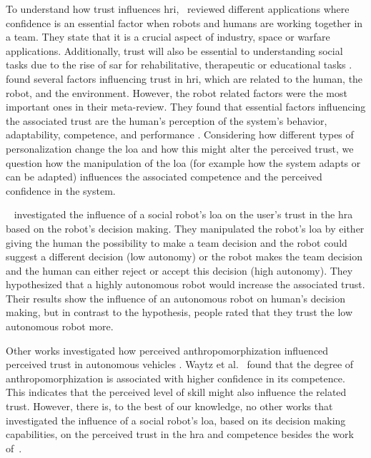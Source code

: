 \documentclass[twocolumn]{svjour3}          %
\begin{document}
To understand how trust influences \gls{hri},~\textcite{hancock2011meta} reviewed different applications where
confidence is an essential factor when robots and humans are working
together in a team. They state that it is a crucial aspect of industry,
space or warfare applications. Additionally, trust will also be
essential to understanding social tasks due to the rise of \gls{sar} for
rehabilitative, therapeutic or educational tasks
\autocite{corry,fasola2013socially}.~\citeauthor{hancock2011meta} found several
factors influencing trust in \gls{hri}, which are related to the human, the
robot, and the environment. However, the robot related factors were the
most important ones in their meta-review. They found that essential
factors influencing the associated trust are the human's perception of
the system's behavior, adaptability, competence, and performance
\autocite{hancock2011meta}. Considering how different types of
personalization change the \gls{loa} and how this might alter the perceived
trust, we question how the manipulation of the \gls{loa} (for example how the
system adapts or can be adapted) influences the associated competence
and the perceived confidence in the system.

~\textcite{rau2013effects} investigated the influence of a
social robot's \gls{loa} on the user's trust in the \gls{hra} based on the robot's
decision making. They manipulated the robot's \gls{loa} by either giving the
human the possibility to make a team decision and the robot could
suggest a different decision (low autonomy) or the robot makes the team
decision and the human can either reject or accept this decision (high
autonomy). They hypothesized that a highly autonomous robot would
increase the associated trust. Their results show the influence of an
autonomous robot on human's decision making, but in contrast to the
hypothesis, people rated that they trust the low autonomous robot more.

Other works investigated how perceived anthropomorphization influenced
perceived trust in autonomous vehicles \autocite{waytz2014mind}. Waytz
et al.~\autocite{waytz2014mind} found that the degree of
anthropomorphization is associated with higher confidence in its
competence. This indicates that the perceived level of skill might also
influence the related trust. However, there is, to the best of our
knowledge, no other works that investigated the influence of a social
robot's \gls{loa}, based on its decision making capabilities, on the perceived trust in the \gls{hra} and competence besides the work of~\textcite{rau2013effects}.
\end{document}
